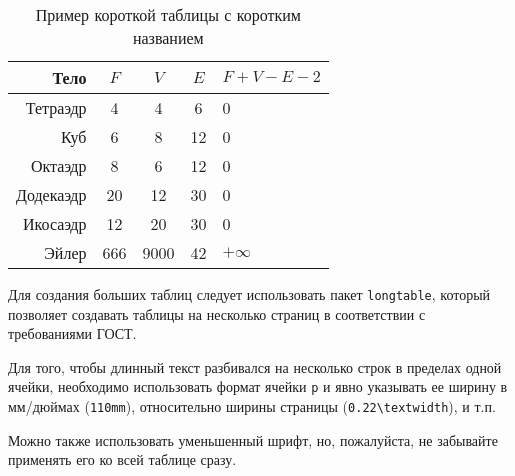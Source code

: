 \begin{table}[ht]
  \caption{Пример короткой таблицы с коротким названием}
  \begin{tabular}{|r|c|c|c|l|}
  \hline
  Тело      & $F$ & $V$  & $E$ & $F+V-E-2$ \\
  \hline
  Тетраэдр  & 4   & 4    & 6   & 0         \\
  Куб       & 6   & 8    & 12  & 0         \\
  Октаэдр   & 8   & 6    & 12  & 0         \\
  Додекаэдр & 20  & 12   & 30  & 0         \\
  Икосаэдр  & 12  & 20   & 30  & 0         \\
  \hline
  Эйлер     & 666 & 9000 & 42  & $+\infty$ \\
  \hline
  \end{tabular}
  \label{tab:tabular}
\end{table}

Для создания больших таблиц следует использовать пакет \verb|longtable|, который позволяет создавать таблицы на несколько страниц в соответствии с требованиями ГОСТ.

Для того, чтобы длинный текст разбивался на несколько строк в пределах одной ячейки, необходимо использовать формат ячейки \texttt{p} и явно указывать ее ширину в мм/дюймах (\texttt{110mm}), относительно ширины страницы (\texttt{0.22\textbackslash textwidth}), и т.п.

Можно также использовать уменьшенный шрифт, но, пожалуйста, не забывайте применять его ко всей таблице сразу.

